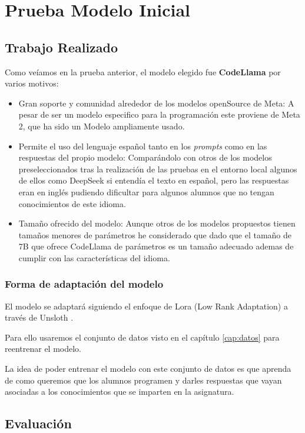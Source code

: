 \chapter{Prueba Modelo Inicial}

\section{Trabajo Realizado}

Como veíamos en la prueba anterior, el modelo elegido fue \textbf{CodeLlama} por varios motivos:

\begin{itemize}
    \item Gran soporte y comunidad alrededor de los modelos openSource de Meta: A pesar de ser un modelo especifico para la programación este proviene de Meta 2, que ha sido un Modelo ampliamente usado.
    \item Permite el uso del lenguaje español tanto en los \textit{prompts} como en las respuestas del propio modelo: Comparándolo con otros de los modelos preseleccionados tras la realización de las pruebas en el entorno local algunos de ellos como DeepSeek si entendía el texto en español, pero las respuestas eran en inglés pudiendo dificultar para algunos alumnos que no tengan conocimientos de este idioma.
    \item Tamaño ofrecido del modelo: Aunque otros de los modelos propuestos tienen tamaños menores de parámetros he considerado que dado que el tamaño de 7B que ofrece CodeLlama de parámetros es un tamaño adecuado ademas de cumplir con las características del idioma.
\end{itemize}

\subsection{Forma de adaptación del modelo}

El modelo se adaptará siguiendo el enfoque de Lora (Low Rank Adaptation) a través de Unsloth \cite{Unsloth}.

Para ello usaremos el conjunto de datos  visto en el capítulo \ref{cap:datos} para reentrenar el modelo.

La idea de poder entrenar el modelo con este conjunto de datos es que aprenda de como queremos que los alumnos programen y darles respuestas que vayan asociadas a los conocimientos que se imparten en la asignatura.

\section{Evaluación}

